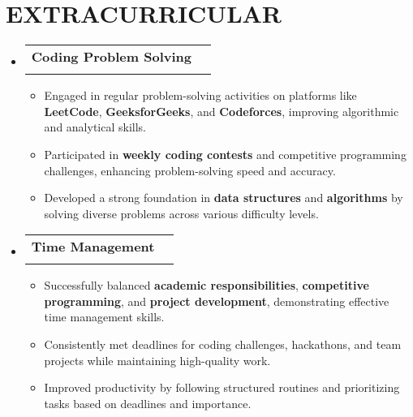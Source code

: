 \documentclass[letterpaper,11pt]{article}
\makeatletter
\newcommand{\resumeItem}[1]{
  \item\small{
    {#1 \vspace{-2pt}}
  }
}
\newcommand{\resumeSubheading}[4]{
  \vspace{-2pt}\item
    \begin{tabular*}{1.0\textwidth}[t]{l@{\extracolsep{\fill}}r}
      \textbf{\large#1} & \textbf{\small #2} \\
      \textit{\large#3} & \textit{\small #4} \\
     
    \end{tabular*}\vspace{-7pt}
}
\newcommand{\resumeSubHeadingListStart}{\begin{itemize}[leftmargin=0.0in, label={}]}
\newcommand{\resumeSubHeadingListEnd}{\end{itemize}}
\newcommand{\resumeItemListStart}{\begin{itemize}}
\newcommand{\resumeItemListEnd}{\end{itemize}\vspace{-5pt}}
\makeatother
\begin{document}
\section{EXTRACURRICULAR}
    \resumeSubHeadingListStart
        \resumeSubheading{Coding Problem Solving}{}{}{}
            \resumeItemListStart
                \resumeItem{\normalsize{Engaged in regular problem-solving activities on platforms like \textbf{LeetCode}, \textbf{GeeksforGeeks}, and \textbf{Codeforces}, improving algorithmic and analytical skills.}}
                \resumeItem{\normalsize{Participated in \textbf{weekly coding contests} and competitive programming challenges, enhancing problem-solving speed and accuracy.}}
                \resumeItem{\normalsize{Developed a strong foundation in \textbf{data structures} and \textbf{algorithms} by solving diverse problems across various difficulty levels.}}
            \resumeItemListEnd
    \resumeSubHeadingListEnd
 \vspace{-11pt}
    \resumeSubHeadingListStart
        \resumeSubheading{Time Management}{}{}{}
            \resumeItemListStart
                \resumeItem{\normalsize{Successfully balanced \textbf{academic responsibilities}, \textbf{competitive programming}, and \textbf{project development}, demonstrating effective time management skills.}}
                \resumeItem{\normalsize{Consistently met deadlines for coding challenges, hackathons, and team projects while maintaining high-quality work.}}
                \resumeItem{\normalsize{Improved productivity by following structured routines and prioritizing tasks based on deadlines and importance.}}
            \resumeItemListEnd
    \resumeSubHeadingListEnd
 \vspace{-11pt}


 
\end{document}
